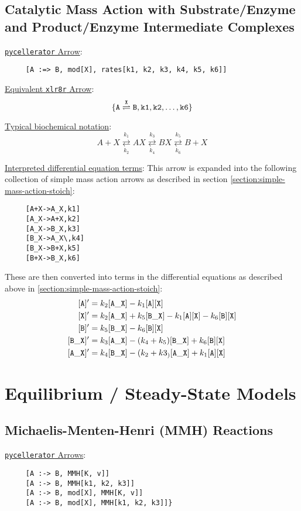 \subsection{Catalytic Mass Action with Substrate/Enzyme and Product/Enzyme Intermediate Complexes}
\label{section:cat-mass-action-two-complex}
\underline{{\tt pycellerator} Arrow}: 
\begin{lstlisting}
     [A :=> B, mod[X], rates[k1, k2, k3, k4, k5, k6]]
\end{lstlisting}

\underline{Equivalent {\tt xlr8r} Arrow}:
$$\tt\{A \overset{X}{\rightleftharpoons} B,k1,k2,\dots,k6 \}$$

\underline{Typical biochemical notation}:
$$ A+X\underset{k_2}{\overset{k_1}  \rightleftarrows } AX \underset{k_4}{ \overset{k_3}{\rightleftarrows} } BX \underset{k_6}{\overset{k_5}{\rightleftarrows}} B+X$$


\underline{Interpreted differential equation terms}:
This arrow is expanded into the following collection of simple mass action arrows as described in section \ref{section:simple-mass-action-stoich}:
\begin{lstlisting}
     [A+X->A_X,k1]
     [A_X->A+X,k2]
     [A_X->B_X,k3]
     [B_X->A_X\,k4]
     [B_X->B+X,k5]
     [B+X->B_X,k6]
\end{lstlisting}
These are then converted into terms in the differential equations as described above in \ref{section:simple-mass-action-stoich}:
\begin{align*}
{\tt [A]'}    &= k_2{\tt [A\_X]} - k_1 {\tt [A][X]}\\
{\tt [X]'}    &= k_2{\tt [A\_X]} + k_5 {\tt [B\_X]} - k_1 {\tt [A][X]} - k_6 {\tt [B][X]}\\
{\tt [B]'}    &= k_5{\tt [B\_X]} - k_6 {\tt [B][X]}\\
{\tt [B\_X]'} &= k_3{\tt [A\_X]} - (k_4+k_5) {\tt [B\_X]} + k_6 {\tt [B][X]}\\
{\tt [A\_X]'} &= k_4{\tt [B\_X]} - (k_2+k3_) {\tt [A\_X]} + k_1 {\tt [A][X]}
\end{align*}



\section{Equilibrium / Steady-State Models}
\subsection{Michaelis-Menten-Henri (MMH) Reactions }
\label{subsection:MMH}
\underline{{\tt pycellerator} Arrows}:
\begin{lstlisting}
     [A :-> B, MMH[K, v]] 
     [A :-> B, MMH[k1, k2, k3]] 
     [A :-> B, mod[X], MMH[K, v]] 
     [A :-> B, mod[X], MMH[k1, k2, k3]]}
\end{lstlisting}

